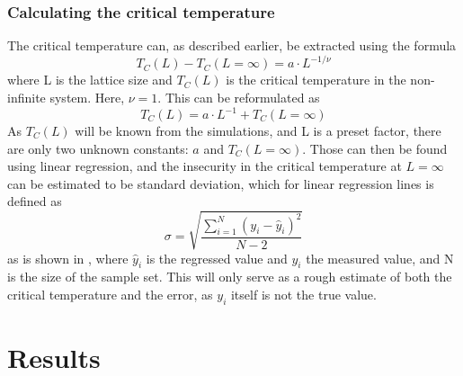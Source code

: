 \documentclass[10pt,a4paper]{article}
\begin{document}
\subsubsection{Calculating the critical temperature}
The critical temperature can, as described earlier, be extracted using the formula 
$$T_C(L)-T_C(L=\infty)=a\cdot L^{-1/\nu}$$
where L is the lattice size and $T_C(L)$ is the critical temperature in the non-infinite system. Here, $\nu=1$. This can be reformulated as 
$$T_C(L)=a\cdot L^{-1}+T_C(L=\infty)$$
As $T_C(L)$ will be known from the simulations, and L is a preset factor, there are only two unknown constants: $a$ and $T_C(L=\infty)$. Those can then be found using linear regression, and the insecurity in the critical temperature at $L=\infty$ can be estimated to be standard deviation, which for linear regression lines is defined as 
\begin{equation}
\sigma=\sqrt{\frac{\sum_{i=1}^{N}(y_i-\hat{y}_i)^2}{N-2}}
\end{equation}
as is shown in \cite{devore2012modern}, where $\hat{y}_i$ is the regressed value and $y_i$ the measured value, and N is the size of the sample set.
This will only serve as a rough estimate of both the critical temperature and the error, as $y_i$ itself is not the true value. 
\section{Results}
\end{document}
